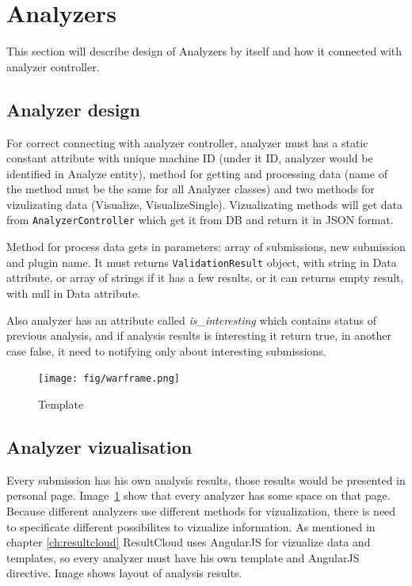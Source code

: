 \section{Analyzers}

This section will describe design of Analyzers by itself and how it connected with analyzer controller.

\subsection{Analyzer design}

For correct connecting with analyzer controller, analyzer must has a static constant attribute with unique machine ID (under it ID, analyzer would be identified in Analyze entity), method for getting and processing data (name of the method must be the same for all Analyzer classes) and two methods for vizulizating data (Visualize, VisualizeSingle). Vizualizating methods will get data from \texttt{AnalyzerController} which get it from DB and return it in JSON format.

Method for process data gets in parameters: array of submissions, new submission and plugin name. It must returns \texttt{ValidationResult} object, with string in Data attribute, or array of strings if it has a few results, or it can returns empty result, with null in Data attribute.

Also analyzer has an attribute called \emph{is\_interesting} which contains status of previous analysis, and if analysis results is interesting it return true, in another case false, it need to notifying only about interesting submissions.

\begin{figure}
  \centering
    \texttt{[image: fig/warframe.png]}
  \caption{Template}
  \label{fig:temp}
\end{figure}

\subsection{Analyzer vizualisation}

Every submission has his own analysis results, those results would be presented in personal page. Image\ \ref{fig:temp} show that every analyzer has some space on that page. Because different analyzers use different methods for vizualization, there is need to specificate different possibilites to vizualize information. As mentioned in chapter \ref{ch:resultcloud} ResultCloud uses AngularJS for vizualize data and templates, so every analyzer must have his own template and AngularJS  directive. Image shows layout of analysis results.


